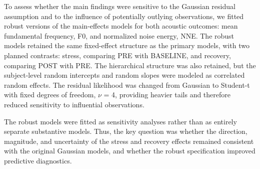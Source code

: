 \documentclass[
  english,
  man,floatsintext]{apa6}
\begin{document}
To assess whether the main findings were sensitive to the Gaussian residual assumption and to the influence of potentially outlying observations, we fitted robust versions of the main-effects models for both acoustic outcomes: mean fundamental frequency, F0, and normalized noise energy, NNE. The robust models retained the same fixed-effect structure as the primary models, with two planned contrasts: stress, comparing PRE with BASELINE, and recovery, comparing POST with PRE. The hierarchical structure was also retained, but the subject-level random intercepts and random slopes were modeled as correlated random effects. The residual likelihood was changed from Gaussian to Student-t with fixed degrees of freedom, \(\nu\) = 4, providing heavier tails and therefore reduced sensitivity to influential observations.

The robust models were fitted as sensitivity analyses rather than as entirely separate substantive models. Thus, the key question was whether the direction, magnitude, and uncertainty of the stress and recovery effects remained consistent with the original Gaussian models, and whether the robust specification improved predictive diagnostics.
\end{document}
